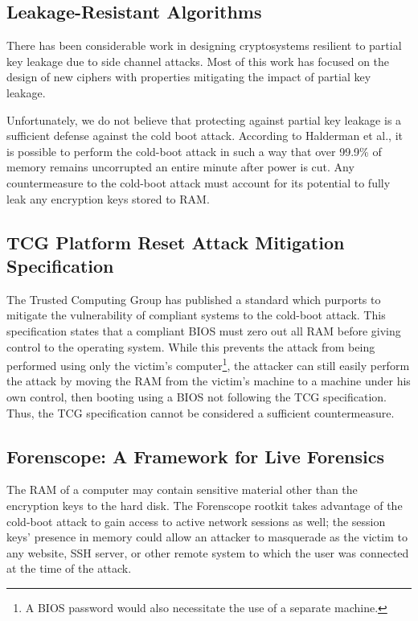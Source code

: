 \documentclass[letterpaper,twocolumn,nonatbib,10pt]{article}
\begin{document}
\subsection{Leakage-Resistant Algorithms}

There has been considerable work \cite{Akavia09simultaneoushardcore}\cite{DziembowskiP08}\cite{Naor2009}\cite{leakpractice}
in designing cryptosystems resilient to partial key leakage due to
side channel attacks.  Most of this work has focused on the design of
new ciphers with properties mitigating the impact of partial key
leakage.

Unfortunately, we do not believe that protecting against partial key
leakage is a sufficient defense against the cold boot attack.
According to Halderman et al., it is possible to perform the cold-boot
attack in such a way that over 99.9\% of memory remains uncorrupted an
entire minute after power is cut.  Any countermeasure to the cold-boot
attack must account for its potential to fully leak any encryption
keys stored to RAM.

\subsection{TCG Platform Reset Attack Mitigation Specification}

The Trusted Computing Group has published a
standard\cite{tcgmitigation} which purports to mitigate the
vulnerability of compliant systems to the cold-boot attack.  This
specification states that a compliant BIOS must zero out all RAM
before giving control to the operating system.  While this prevents
the attack from being performed using only the victim's
computer\footnote{A BIOS password would also necessitate the use of a
  separate machine.}, the attacker can still easily perform the attack
by moving the RAM from the victim's machine to a machine under his own
control, then booting using a BIOS not following the TCG
specification.  Thus, the TCG specification cannot be considered a
sufficient countermeasure.

\subsection{Forenscope: A Framework for Live Forensics}

The RAM of a computer may contain sensitive material other than the
encryption keys to the hard disk.  The Forenscope rootkit
\cite{forenscope} takes advantage of the cold-boot attack to gain
access to active network sessions as well; the session keys' presence
in memory could allow an attacker to masquerade as the victim to any
website, SSH server, or other remote system to which the user was
connected at the time of the attack.
\end{document}
